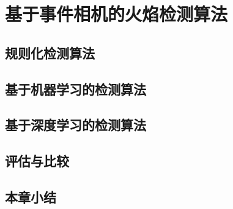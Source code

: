 
\chapter{基于事件相机的火焰检测算法}

\section{规则化检测算法}

\section{基于机器学习的检测算法}

\section{基于深度学习的检测算法}

\section{评估与比较}

\section{本章小结}